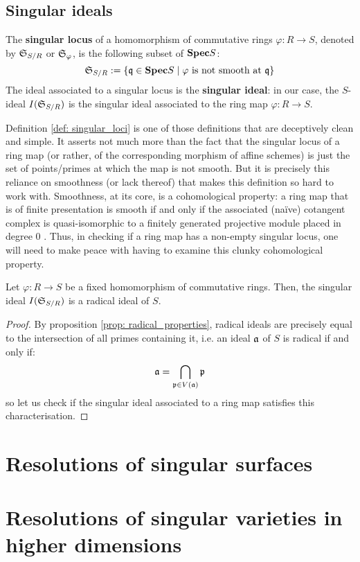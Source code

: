         \subsection{Singular ideals}
            \begin{definition} \label{def: singular_loci}
                The \textbf{singular locus} of a homomorphism of commutative rings $\varphi: R \to S$, denoted by $\mathfrak{S}_{S/R}$ or $\mathfrak{S}_{\varphi}$, is the following subset of $\mathbf{Spec} S$:
                    $$\mathfrak{S}_{S/R} := \{\mathfrak{q} \in \mathbf{Spec} S \mid \text{$\varphi$ is not smooth at $\mathfrak{q}$}\}$$
                The ideal associated to a singular locus is the \textbf{singular ideal}: in our case, the $S$-ideal $I(\mathfrak{S}_{S/R})$ is the singular ideal associated to the ring map $\varphi: R \to S$.
            \end{definition}
            \begin{remark}
                Definition \ref{def: singular_loci} is one of those definitions that are deceptively clean and simple. It asserts not much more than the fact that the singular locus of a ring map (or rather, of the corresponding morphism of affine schemes) is just the set of points/primes at which the map is not smooth. But it is precisely this reliance on smoothness (or lack thereof) that makes this definition so hard to work with. Smoothness, at its core, is a cohomological property: a ring map that is of finite presentation is smooth if and only if the associated (na\"ive) cotangent complex is quasi-isomorphic to a finitely generated projective module placed in degree $0$ \cite[\href{https://stacks.math.columbia.edu/tag/00T2}{Tag 00T2}]{stacks}. Thus, in checking if a ring map has a non-empty singular locus, one will need to make peace with having to examine this clunky cohomological property.  
            \end{remark}
            
            \begin{proposition}
                Let $\varphi: R \to S$ be a fixed homomorphism of commutative rings. Then, the singular ideal $I(\mathfrak{S}_{S/R})$ is a radical ideal of $S$.
            \end{proposition}
                \begin{proof}
                    By proposition \ref{prop: radical_properties}, radical ideals are precisely equal to the intersection of all primes containing it, i.e. an ideal $\mathfrak{a}$ of $S$ is radical if and only if:
                        $$\mathfrak{a} = \bigcap_{\mathfrak{p} \in V(\mathfrak{a})} \mathfrak{p}$$
                    so let us check if the singular ideal associated to a ring map satisfies this characterisation. 
                \end{proof}

    \section{Resolutions of singular surfaces}
    
    \section{Resolutions of singular varieties in higher dimensions}